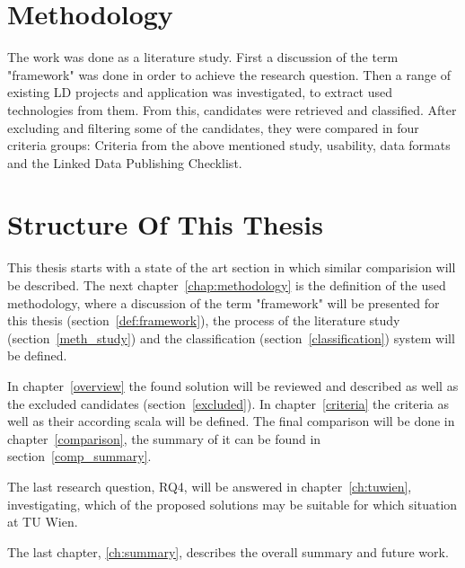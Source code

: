 \section{Methodology}

The work was done as a literature study. First a discussion of the term "framework" was done in order to achieve the research question. Then a range of existing LD projects and application was investigated, to extract used technologies from them. From this, candidates were retrieved and classified. After excluding and filtering some of the candidates, they were compared in four criteria groups: Criteria from the above mentioned study, usability, data formats and the Linked Data Publishing Checklist.

\section{Structure Of This Thesis}
This thesis starts with a state of the art section in which similar comparision will be described. The next chapter~\ref{chap:methodology} is the definition of the used methodology, where a discussion of the term "framework" will be presented for this thesis (section~\ref{def:framework}), the process of the literature study (section~\ref{meth_study}) and the classification (section~\ref{classification}) system will be defined.

In chapter~\ref{overview} the found solution will be reviewed and described as well as the excluded candidates (section~\ref{excluded}). In chapter~\ref{criteria} the criteria as well as their according scala will be defined. The final comparison will be done in chapter~\ref{comparison}, the summary of it can be found in section~\ref{comp_summary}.

The last research question, RQ4, will be answered in chapter~\ref{ch:tuwien}, investigating, which of the proposed solutions may be suitable for which situation at TU Wien.

The last chapter, \ref{ch:summary}, describes the overall summary and future work.